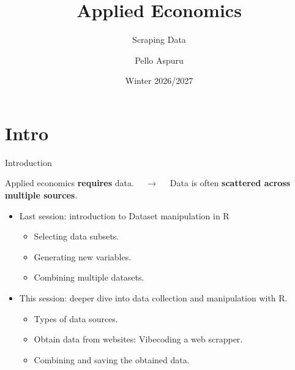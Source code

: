 \documentclass[9pt,aspectratio=169]{beamer}
\title{Applied Economics}
\subtitle{Scraping Data}
\author{Pello Aspuru}
\date{Winter 2026/2027}
\begin{document}
{
  \begin{frame}
    \titlepage
  \end{frame}
}

\section{Intro}

\begin{frame}{Introduction}

\begin{center}
  Applied economics \textbf{requires} data. 
  $\quad \rightarrow \quad $
  Data is often \textbf{scattered across multiple sources}.
\end{center}
\pause
\begin{itemize}
  \item Last session: introduction to Dataset manipulation in R
  \begin{itemize}
    \item Selecting data subsets.
    \item Generating new variables.
    \item Combining multiple datasets.
  \end{itemize}
  \pause
  \item This session: deeper dive into data collection and manipulation with R.
  \begin{itemize}
    \item Types of data sources.
    \item Obtain data from websites: Vibecoding a web scrapper.
    \item Combining and saving the obtained data.
  \end{itemize}
\end{itemize}
\end{frame}
\end{document}

